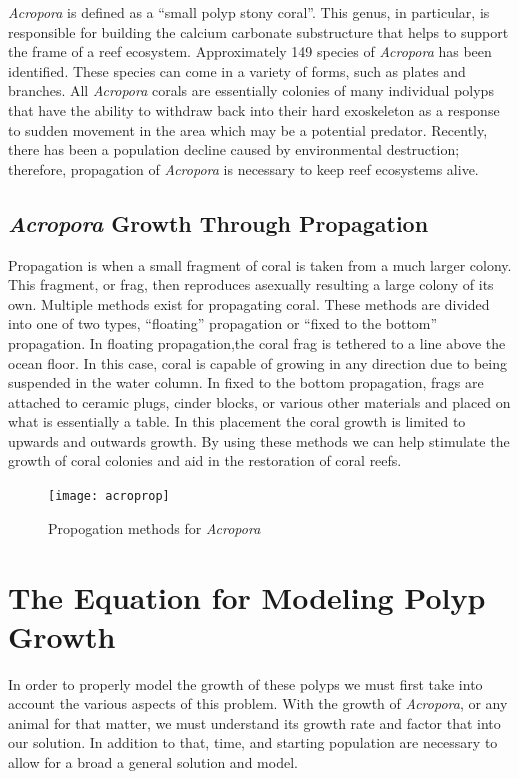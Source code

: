 \documentclass[12pt]{article}
\begin{document}
	
	 \textit{Acropora} is defined as a ``small polyp stony coral''. This genus, in particular, is responsible for building the calcium carbonate substructure that helps to support the frame of a reef ecosystem. Approximately 149 species of \textit{Acropora} has been identified. These species can come in a variety of forms, such as plates and branches. All \textit{Acropora} corals are essentially colonies of many individual polyps that have the ability to withdraw back into their hard exoskeleton as a response to sudden movement in the area which may be a potential predator. Recently, there has been a population decline caused by environmental destruction; therefore, propagation of \textit{Acropora} is necessary to keep reef ecosystems alive.\cite{wiki:Acropora}
	 
	
	
	\subsection{\textit{Acropora} Growth Through Propagation}
	
	Propagation is when a small fragment of coral is taken from a much larger colony. This fragment, or frag, then reproduces asexually resulting a large colony of its own. Multiple methods exist for propagating coral. These methods are divided into one of two types, “floating” propagation or “fixed to the bottom” propagation. In floating propagation,the coral frag is tethered to a line above the ocean floor. In this case, coral is capable of growing in any direction due to being suspended in the water column. In fixed to the bottom propagation, frags are attached to ceramic plugs, cinder blocks, or various other materials and placed on what is essentially a table. In this placement the coral growth is limited to upwards and outwards growth. By using these methods we can help stimulate the growth of coral colonies and aid in the restoration of coral reefs.\cite{GrowthDynamics}
	
	\begin{figure}[h]
		\centering
		\texttt{[image: acroprop]}
		\caption{Propogation methods for \textit{Acropora}\cite{GrowthDynamics}}
	\end{figure}
	




	\section{The Equation for Modeling Polyp Growth}
	In order to properly model the growth of these polyps we must first take into account the various aspects of this problem. With the growth of \textit{Acropora}, or any animal for that matter, we must understand its growth rate and factor that into our solution. In addition to that, time, and starting population are necessary to allow for a broad a general solution and model.
	
\end{document}
